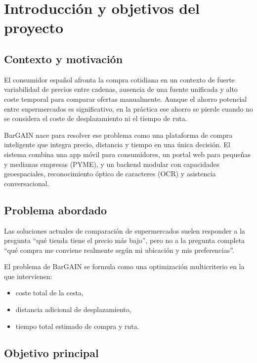 \chapter{Introducci\'on y objetivos del proyecto}\label{defobjetivos}

\section{Contexto y motivaci\'on}

El consumidor espa\~nol afronta la compra cotidiana en un contexto de fuerte variabilidad de
precios entre cadenas, ausencia de una fuente unificada y alto coste temporal para comparar
ofertas manualmente. Aunque el ahorro potencial entre supermercados es significativo, en la
pr\'actica ese ahorro se pierde cuando no se considera el coste de desplazamiento ni el tiempo de
ruta.

BarGAIN nace para resolver ese problema como una plataforma de compra inteligente que integra
precio, distancia y tiempo en una \'unica decisi\'on. El sistema combina una app m\'ovil para
consumidores, un portal web para peque\~nas y medianas empresas (PYME), y un backend modular
con capacidades geoespaciales, reconocimiento \'optico de caracteres (OCR) y asistencia
conversacional.

\section{Problema abordado}

Las soluciones actuales de comparaci\'on de supermercados suelen responder a la pregunta
``qu\'e tienda tiene el precio m\'as bajo'', pero no a la pregunta completa ``qu\'e compra me
conviene realmente seg\'un mi ubicaci\'on y mis preferencias''.

El problema de BarGAIN se formula como una optimizaci\'on multicriterio en la que intervienen:

\begin{itemize}
	\item coste total de la cesta,
	\item distancia adicional de desplazamiento,
	\item tiempo total estimado de compra y ruta.
\end{itemize}

\section{Objetivo principal}

